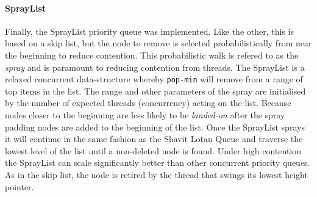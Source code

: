 \paragraph{SprayList} Finally, the SprayList priority queue was implemented.\cite{SprayList}  Like the other, this is based on a skip list, but the node to remove is selected probabilistically from near the beginning to reduce contention. This probabilistic walk is refered to as the \textit{spray} and is paramount to reducing contention from threads. The SprayList is a relaxed concurrent data-structure whereby \texttt{pop-min} will remove from a range of top items in the list. The range and other parameters of the spray are initialised by the number of expected threads (concurrency) acting on the list. Because nodes closer to the beginning are less likely to be \textit{landed-on} after the spray padding nodes are added to the beginning of the list. Once the SprayList sprays it will continue in the same fashion as the Shavit Lotan Queue and traverse the lowest level of the list until a non-deleted node is found. Under high contention the SprayList can scale significantly better than other concurrent priority queues. As in the skip list, the node is retired by the thread that swings its lowest height pointer. 
